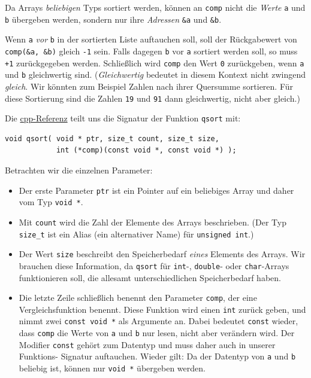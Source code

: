 Da Arrays \emph{beliebigen} Typs sortiert werden, können an \texttt{comp} nicht die \emph{Werte} \texttt{a} und \texttt{b} übergeben werden, sondern nur ihre \emph{Adressen} \texttt{\&a} und \texttt{\&b}.

Wenn \texttt{a} \emph{vor} \texttt{b} in der sortierten Liste auftauchen soll, soll der Rückgabewert von \texttt{comp(\&a, \&b)} gleich \texttt{-1} sein. Falls dagegen \texttt{b} vor \texttt{a} sortiert werden soll, so muss \texttt{+1} zurückgegeben werden. Schließlich wird \texttt{comp} den Wert \texttt{0} zurückgeben, wenn \texttt{a} und \texttt{b} gleichwertig sind. (\emph{Gleichwertig} bedeutet in diesem Kontext nicht zwingend \emph{gleich}. Wir könnten zum Beispiel Zahlen nach ihrer Quersumme sortieren. Für diese Sortierung sind die Zahlen \texttt{19} und \texttt{91} dann gleichwertig, nicht aber gleich.) 

Die \href{https://en.cppreference.com/w/c/algorithm/qsort}{cpp-Referenz} teilt uns die Signatur der Funktion \texttt{qsort} mit:

\begin{codebox}
\begin{verbatim}
void qsort( void * ptr, size_t count, size_t size,
            int (*comp)(const void *, const void *) );
\end{verbatim}
\end{codebox}

Betrachten wir die einzelnen Parameter:
\begin{itemize}
\item Der erste Parameter \texttt{ptr} ist ein Pointer auf ein beliebiges Array und daher vom Typ
		\texttt{void *}. 
\item Mit \texttt{count} wird die Zahl der Elemente des Arrays beschrieben. (Der Typ 
		\texttt{size_t} ist ein Alias (ein alternativer Name) für \texttt{unsigned int}.)
\item Der Wert \texttt{size} beschreibt den Speicherbedarf \emph{eines} Elements des Arrays. Wir
		brauchen diese Information, da \texttt{qsort} \ua für \texttt{int}-, 
		\texttt{double}- oder \texttt{char}-Arrays funktionieren soll, die allesamt 
		unterschiedlichen Speicherbedarf haben.
\item Die letzte Zeile schließlich benennt den Parameter \texttt{comp}, der eine Vergleichsfunktion
		benennt. Diese Funktion wird einen \texttt{int} zurück geben, und nimmt zwei
		\texttt{const void *} als Argumente an. Dabei bedeutet \texttt{const} wieder, dass
		\texttt{comp} die Werte von \texttt{a} und \texttt{b} nur lesen, nicht aber verändern wird.
		Der Modifier \texttt{const} gehört zum Datentyp und muss daher auch in unserer Funktions-
		Signatur auftauchen. Wieder gilt: Da der Datentyp von \texttt{a} und \texttt{b} beliebig ist,
		können nur \texttt{void *} übergeben werden.
\end{itemize}

